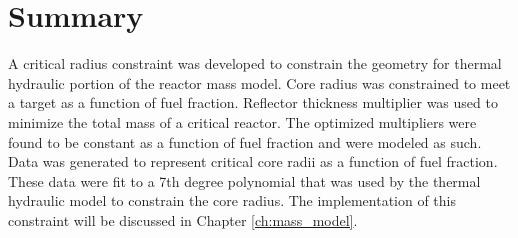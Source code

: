 \section{Summary}
A critical radius constraint was developed to constrain the geometry 
for thermal hydraulic portion of the reactor mass model. Core radius 
was constrained  to meet a target \keff as a function of
fuel fraction. Reflector thickness multiplier was used to minimize 
the total mass of a critical reactor. The optimized multipliers were 
found to be constant as a function of fuel
fraction and were modeled as such. Data was generated to represent critical core
radii as a function of fuel fraction. These data were fit to a 7th
degree polynomial that was used by the thermal hydraulic model to constrain the
core radius. The implementation of this constraint will be discussed in Chapter
\ref{ch:mass_model}.
